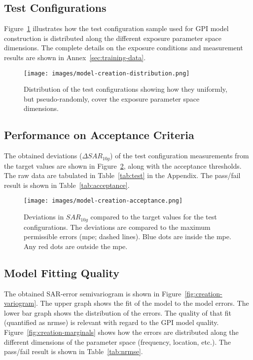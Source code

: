 \documentclass{article}
\begin{document}


\FloatBarrier
\subsection{Test Configurations}

Figure~\ref{fig:training-dist} illustrates how the test configuration sample used for GPI model construction is distributed along the different exposure parameter space dimensions. The complete details on the exposure conditions and measurement results are shown in Annex~\ref{sec:training-data}.

\begin{figure} \centering
\texttt{[image: images/model-creation-distribution.png]}
\caption{Distribution of the test configurations showing how they uniformly, but pseudo-randomly, cover the exposure parameter space dimensions.} \label{fig:training-dist}
\end{figure}

\FloatBarrier
\subsection{Performance on Acceptance Criteria}
The obtained deviations ($\Delta SAR_{10g}$) of the test configuration measurements from the target values are shown in Figure~\ref{fig:creation-acc}, along with the acceptance thresholds. The raw data are tabulated in Table~\ref{tab:test} in the Appendix.
The pass/fail result is shown in Table~\ref{tab:acceptance}.



\begin{figure}[H] \centering
\texttt{[image: images/model-creation-acceptance.png]}
\caption{Deviations in $SAR_{10g}$ compared to the target values for the test configurations. The deviations are compared to the maximum permissible errors (mpe; dashed lines). Blue dots are inside the mpe. Any red dots are outside the mpe.} \label{fig:creation-acc}
\end{figure}

\FloatBarrier
\subsection{Model Fitting Quality}
The obtained SAR-error semivariogram is shown in Figure~\ref{fig:creation-variogram}. The upper graph shows the fit of the model to the model errors. The lower bar graph shows the distribution of the errors. The quality of that fit (quantified as nrmse) is relevant with regard to the GPI model quality. Figure~\ref{fig:creation-marginals} shows how the errors are distributed along the different dimensions of the parameter space (frequency, location, etc.). The pass/fail result is shown in Table~\ref{tab:nrmse}.
\end{document}
